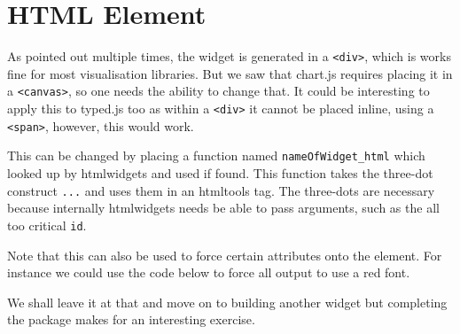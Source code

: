 \documentclass[
]{krantz}
\makeatletter
\newenvironment{Shaded}{\begin{snugshade}}{\end{snugshade}}
\newcommand{\ControlFlowTok}[1]{\textcolor[rgb]{0.27,0.27,0.27}{\textbf{#1}}}
\newcommand{\DataTypeTok}[1]{\textcolor[rgb]{0.27,0.27,0.27}{#1}}
\newcommand{\KeywordTok}[1]{\textcolor[rgb]{0.27,0.27,0.27}{\textbf{#1}}}
\newcommand{\NormalTok}[1]{#1}
\newcommand{\OperatorTok}[1]{\textcolor[rgb]{0.43,0.43,0.43}{\textbf{#1}}}
\newcommand{\StringTok}[1]{\textcolor[rgb]{0.5,0.5,0.5}{#1}}
\newenvironment{kframe}{%
\medskip{}
\setlength{\fboxsep}{.8em}
 \def\at@end@of@kframe{}%
 \ifinner\ifhmode%
  \def\at@end@of@kframe{\end{minipage}}%
  \begin{minipage}{\columnwidth}%
 \fi\fi%
 \def\FrameCommand##1{\hskip\@totalleftmargin \hskip-\fboxsep
 \colorbox{shadecolor}{##1}\hskip-\fboxsep
     \hskip-\linewidth \hskip-\@totalleftmargin \hskip\columnwidth}%
 \MakeFramed {\advance\hsize-\width
   \@totalleftmargin\z@ \linewidth\hsize
   \@setminipage}}%
 {\par\unskip\endMakeFramed%
 \at@end@of@kframe}
\renewenvironment{Shaded}{\begin{kframe}}{\end{kframe}}
\makeatother
\begin{document}
\hypertarget{html-element}{%
\section*{HTML Element}\label{html-element}}


As pointed out multiple times, the widget is generated in a \texttt{\textless{}div\textgreater{}}, which is works fine for most visualisation libraries. But we saw that chart.js requires placing it in a \texttt{\textless{}canvas\textgreater{}}, so one needs the ability to change that. It could be interesting to apply this to typed.js too as within a \texttt{\textless{}div\textgreater{}} it cannot be placed inline, using a \texttt{\textless{}span\textgreater{}}, however, this would work.

This can be changed by placing a function named \texttt{nameOfWidget\_html} which looked up by htmlwidgets and used if found. This function takes the three-dot construct \texttt{...} and uses them in an htmltools tag. The three-dots are necessary because internally htmlwidgets needs be able to pass arguments, such as the all too critical \texttt{id}.

\begin{Shaded}
\end{Shaded}

Note that this can also be used to force certain attributes onto the element. For instance we could use the code below to force all output to use a red font.

\begin{Shaded}
\end{Shaded}

We shall leave it at that and move on to building another widget but completing the package makes for an interesting exercise.
\end{document}
